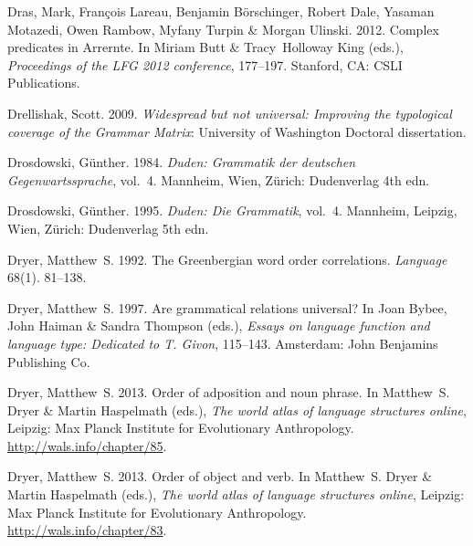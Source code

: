 \begin{thebibliography}{1420}
Dras, Mark, Fran{\c c}ois Lareau, Benjamin B{\"o}rschinger, Robert Dale,
  Yasaman Motazedi, Owen Rambow, Myfany Turpin \& Morgan Ulinski. 2012.
\newblock Complex predicates in {Arrernte}.
\newblock In Miriam Butt \& Tracy~Holloway King (eds.), \emph{Proceedings of
  the {LFG 2012} conference}, 177--197. Stanford, CA: CSLI Publications.

Drellishak, Scott. 2009.
\newblock \emph{Widespread but not universal: {Improving} the typological
  coverage of the {Grammar Matrix}}: University of Washington Doctoral
  dissertation.

Drosdowski, G{\"u}nther. 1984.
\newblock \emph{{Duden: Grammatik der deutschen Gegenwartssprache}}, vol.~4.
\newblock Mannheim, Wien, Z{\"u}rich: Dudenverlag 4th edn.

Drosdowski, G{\"u}nther. 1995.
\newblock \emph{{Duden: Die Grammatik}}, vol.~4.
\newblock Mannheim, Leipzig, Wien, Z{\"u}rich: Dudenverlag 5th edn.

Dryer, Matthew~S. 1992.
\newblock The {Greenbergian} word order correlations.
\newblock \emph{Language} 68(1). 81--138.

Dryer, Matthew~S. 1997.
\newblock Are grammatical relations universal?
\newblock In Joan Bybee, John Haiman \& Sandra Thompson (eds.), \emph{Essays on
  language function and language type: {Dedicated to T. Givon}}, 115--143.
  Amsterdam: John Benjamins Publishing Co.

Dryer, Matthew~S. 2013{}.
\newblock Order of adposition and noun phrase.
\newblock In Matthew~S. Dryer \& Martin Haspelmath (eds.), \emph{The world
  atlas of language structures online}, Leipzig: Max Planck Institute for
  Evolutionary Anthropology.
\newblock \urlprefix\url{http://wals.info/chapter/85}.

Dryer, Matthew~S. 2013{}.
\newblock Order of object and verb.
\newblock In Matthew~S. Dryer \& Martin Haspelmath (eds.), \emph{The world
  atlas of language structures online}, Leipzig: Max Planck Institute for
  Evolutionary Anthropology.
\newblock \urlprefix\url{http://wals.info/chapter/83}.


\end{thebibliography}

